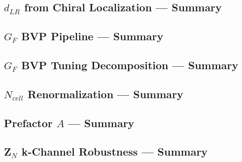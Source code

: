 \subsection*{$d_{LR}$ from Chiral Localization --- Summary}


\subsection*{$G_F$ BVP Pipeline --- Summary}


\subsection*{$G_F$ BVP Tuning Decomposition --- Summary}


\subsection*{$N_{cell}$ Renormalization --- Summary}


\subsection*{Prefactor $A$ --- Summary}


\subsection*{Z$_N$ k-Channel Robustness --- Summary}


